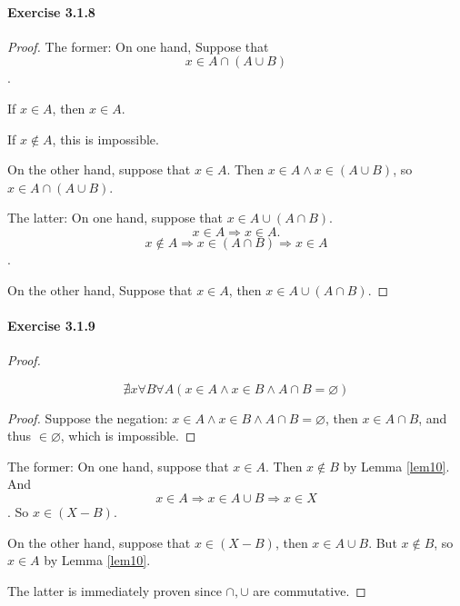 \paragraph{Exercise 3.1.8} \label{exercise3.1.8}
\begin{proof}
The former: On one hand, 
Suppose that 
\[
x \in A \cap (A \cup B)
\].

If $x \in A$, then $x \in A$.

If $x \notin A$, this is impossible.

On the other hand, suppose that $x \in A$.
Then $x \in A \wedge x \in (A \cup B)$, so $x \in A \cap (A \cup B)$.

The latter: On one hand, suppose that $x \in A \cup (A \cap B)$.
\[
x \in A \Longrightarrow x \in A.
\]
\[
x \notin A \Longrightarrow x \in (A \cap B) \Longrightarrow x \in A
\].

On the other hand, Suppose that $x \in A$, then $x \in A \cup (A \cap B)$.
\end{proof}

\paragraph{Exercise 3.1.9} \label{exercise3.1.9}
\begin{proof}
\begin{lem} \label{lem10}
\[
\nexists x\forall B\forall A(x \in A \wedge x \in B \wedge A \cap B = \varnothing)
\]
\end{lem}
\begin{proof}
Suppose the negation: $x \in A \wedge x \in B \wedge A \cap B = \varnothing$, then 
$x \in A \cap B$, and thus $\in \varnothing$, which is impossible.
\end{proof}

The former: On one hand, suppose that $x \in A$. Then $x \notin B$ by Lemma \ref{lem10}. And
\[
x \in A \Longrightarrow x \in A \cup B \Longrightarrow x \in X
\].
So $x \in (X-B)$.

On the other hand, suppose that $x \in (X-B)$, then $x \in A \cup B$. But $x \notin B$, so $x \in A$ by 
Lemma \ref{lem10}.

The latter is immediately proven since $\cap,\cup$ are commutative.
\end{proof}

